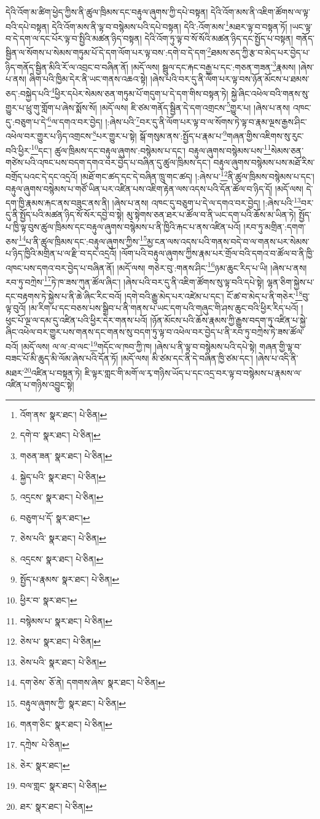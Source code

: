 དེའི་འོག་མ་ཚིག་ཕྱེད་ཀྱིས་ནི་ཚུལ་ཁྲིམས་དང་བརྟུལ་ཞུགས་ཀྱི་དཔེ་བསྟན། དེའི་འོག་མས་ནི་འཇིག་ཚོགས་ལ་ལྟ་བའི་དཔེ་བསྟན། དེའི་འོག་མས་ནི་ལྟ་བ་བསྙེམས་པའི་དཔེ་བསྟན། དེའི་:འོག་མས་\footnote{འོག་ནས་  སྣར་ཐང་།  པེ་ཅིན། }མཐར་ལྟ་བ་བསྟན་ཏོ། །ཡང་ལྟ་བ་དེ་དག་ལ་དང་པོར་ལྟ་བ་སྤྱིའི་མཚན་ཉིད་བསྟན། དེའི་འོག་ཏུ་ལྟ་བ་སོ་སོའི་མཚན་ཉིད་དང་སྤྱོད་པ་བསྟན། གནོད་སྦྱིན་ལ་སོགས་པ་སེམས་གཏུམ་པོ་དེ་དག་ལོག་པར་ལྟ་བས་:དགེ་བ་དེ་དག་\footnote{དགེ་བ་  སྣར་ཐང་།  པེ་ཅིན། }ཐམས་ཅད་ཀྱི་རྩ་བ་མེད་པར་བྱེད་པ་ཉིད་གནོད་སྦྱིན་མིའི་རོ་ལ་འབྲང་བ་བཞིན་ནོ། །མདོ་ལས། སྦྲུལ་དང་རྐང་བརྒྱ་པ་དང་:གཅན་གཟན་\footnote{གཅན་ཟན་  སྣར་ཐང་།  པེ་ཅིན། }རྣམས། །ཞེས་པ་ནས། ཞིག་པའི་ཁྱིམ་དེར་ནི་ཡང་གནས་འཆའ་སྟེ། །ཞེས་པའི་བར་དུ་ནི་ལོག་པར་ལྟ་བས་ཉོན་མོངས་པ་ཐམས་ཅད་:བསྐྱེད་པའི་\footnote{སྐྱེད་པའི་  སྣར་ཐང་།  པེ་ཅིན། }ཕྱིར་དཔེར་སེམས་ཅན་གཏུམ་པོ་གདུག་པ་དེ་དག་གིས་བསྟན་ཏེ། སྐྱེ་ཞིང་འཕེལ་བའི་གནས་སུ་གྱུར་པ་ཕྲུ་གུ་གློག་པ་ཞེས་སྨོས་སོ། །མདོ་ལས། ཇི་ཙམ་གནོད་སྦྱིན་དེ་དག་འགྲངས་\footnote{འདྲངས་  སྣར་ཐང་།  པེ་ཅིན། }གྱུར་པ། །ཞེས་པ་ནས། འཁང་དུ་:བཅུག་པ་དེ་\footnote{བཅུག་པ་དོ་  སྣར་ཐང་། }ལ་དགའ་བར་བྱེད། །:ཞེས་པའི་\footnote{ཅེས་པའི་  སྣར་ཐང་།  པེ་ཅིན། }བར་དུ་ནི་ལོག་པར་ལྟ་བ་ལ་སོགས་ཏེ་ལྟ་བ་རྣམ་ལྔས་རྒྱས་ཤིང་འཕེལ་བར་གྱུར་པ་ཉིད་འགྲངས་\footnote{འདྲངས་  སྣར་ཐང་།  པེ་ཅིན། }པར་གྱུར་པ་སྟེ། སྒོ་གསུམ་ནས་:སྤྱོད་པ་རྣམ་པ་\footnote{སྤྱོད་པ་རྣམས་  སྣར་ཐང་།  པེ་ཅིན། }གཞན་གྱིས་འཇིགས་སུ་རུང་བའི་ཕྱིར་\footnote{ཕྱིར་བ་  སྣར་ཐང་། }དང་། ཚུལ་ཁྲིམས་དང་བརྟུལ་ཞུགས་:བསྙེམས་པ་དང་། བརྟུལ་ཞུགས་བསྙེམས་པས་\footnote{བསྙེམས་པ་  སྣར་ཐང་།  པེ་ཅིན། }སེམས་ཅན་གཙེས་པའི་འཁང་པས་བདག་དགའ་བར་བྱེད་པ་བཞིན་དུ་ཚུལ་ཁྲིམས་དང་། བརྟུལ་ཞུགས་བསྙེམས་པས་མཐོ་རིས་བགྲོད་པའང་དེ་དང་འདྲའོ། །མཐོ་གང་ཚད་དང་དེ་བཞིན་ཁྲུ་གང་ཚད། །:ཞེས་པ་\footnote{ཅེས་པ་  སྣར་ཐང་།  པེ་ཅིན། }ནི་ཚུལ་ཁྲིམས་བསྙེམས་པ་དང་། བརྟུལ་ཞུགས་བསྙེམས་པ་གཙོ་ཡིན་པར་འཛིན་པས་འཇིག་རྟེན་ལས་འདས་པའི་དོན་ཚོལ་བ་ཉིད་དོ། །མདོ་ལས། དེ་དག་ཁྱི་རྣམས་རྐང་ནས་བཟུང་ནས་ནི། །ཞེས་པ་ནས། འཁང་དུ་བཅུག་པ་དེ་ལ་དགའ་བར་བྱེད། །:ཞེས་པའི་\footnote{ཅེས་པའི་  སྣར་ཐང་།  པེ་ཅིན། }བར་དུ་ནི་སྤྱོད་པའི་མཚན་ཉིད་སོ་སོར་དབྱེ་བ་སྟེ། མུ་སྟེགས་ཅན་ཐར་པ་ཚོལ་བ་ནི་ཡང་དག་པའི་ཆོས་མ་ཡིན་ཏེ། སྤྱོད་པ་ཁྱི་ལྟ་བུས་ཚུལ་ཁྲིམས་དང་བརྟུལ་ཞུགས་བསྙེམས་པ་ནི་ཁྱིའི་རྐང་པ་ནས་འཛིན་པའོ། །རབ་ཏུ་མགྲིན་:དགག་ཅས་\footnote{དག་ཅེས་  ཅོ་ནེ། དགགས་ཞེས་  སྣར་ཐང་།  པེ་ཅིན། }པ་ནི་ཚུལ་ཁྲིམས་དང་:བརྟུལ་ཞུགས་ཀྱིས་\footnote{བརྟུལ་ཞུགས་ཀྱི་  སྣར་ཐང་།  པེ་ཅིན། }མྱ་ངན་ལས་འདས་པའི་གནས་བདེ་བ་ལ་གནས་པར་སེམས་པ་ཉིད་ཁྱིའི་མགྲིན་པ་ལ་རྫི་བ་དང་འདྲའོ། །ལོག་པའི་བརྟུལ་ཞུགས་ཀྱིས་རྣམ་པར་གྲོལ་བའི་དགའ་བ་ཚོལ་བ་ནི་ཁྱི་འཁང་པས་དགའ་བར་བྱེད་པ་བཞིན་ནོ། །མདོ་ལས། གཅེར་བུ་:གནས་ཤིང་\footnote{གནག་ཅིང་  སྣར་ཐང་།  པེ་ཅིན། }ཉམ་ཆུང་རིད་པ་ཡི། །ཞེས་པ་ནས། རབ་ཏུ་བཀྲེས་\footnote{དཀྲེས་  པེ་ཅིན། }ཏེ་ཁ་ཟས་ཀུན་ཚོལ་ཞིང་། །ཞེས་པའི་བར་དུ་ནི་འཇིག་ཚོགས་སུ་ལྟ་བའི་དཔེ་སྟེ། ལྷན་ཅིག་སྐྱེས་པ་དང་བརྟགས་ཏེ་སྐྱེས་པ་ནི་ཆེ་ཞིང་རིང་བའོ། །དགེ་བའི་རྒྱུ་མེད་པར་འཛེམ་པ་དང་། ངོ་ཚ་བ་མེད་པ་ནི་གཅེར་\footnote{ཅེར་  སྣར་ཐང་། }བུ་ལྟ་བུའོ། །མ་རིག་པ་དང་བཅས་པས་སྒྲིབ་པ་ནི་གནས་པ་ཡང་དག་པའི་གཞུང་གི་ཤས་ཆུང་བའི་ཕྱིར་རིད་པའོ། །ཕུང་པོ་ལྔ་ལ་དམ་དུ་འཛིན་པའི་ཕྱིར་དེར་གནས་པའོ། །ཉོན་མོངས་པའི་ཆོས་རྣམས་ཀྱི་རྒྱུས་བདག་ཏུ་འཛིན་པ་སྐྱེ་ཞིང་འཕེལ་བར་གྱུར་པས་གནས་དང་གནས་སུ་བདག་ཏུ་ལྟ་བ་འཕེལ་བར་བྱེད་པ་ནི་རབ་ཏུ་བཀྲེས་ཏེ་ཟས་ཚོལ་བའོ། །མདོ་ལས། ལ་ལ་:བ་ལང་\footnote{བལ་གླང་  སྣར་ཐང་།  པེ་ཅིན། }གདོང་ལ་ཁབ་ཀྱི་ཁ། །ཞེས་པ་ནི་ལྟ་བ་བསྙེམས་པའི་དཔེ་སྟེ། གཞན་གྱི་ལྟ་བ་བཟང་པོ་མི་ཆུད་མི་ལོམ་ཞེས་པའི་དོན་ཏོ། །མདོ་ལས། མི་ཙམ་དང་ནི་དེ་བཞིན་ཁྱི་ཙམ་དང་། །ཞེས་པ་འདི་ནི་མཐར་\footnote{ཐར་  སྣར་ཐང་།  པེ་ཅིན། }འཛིན་པ་བསྟན་ཏེ། ཇི་ལྟར་གླང་གི་མགོ་ལ་རྭ་གཉིས་ཡོད་པ་དང་འདྲ་བར་ལྟ་བ་བསྙེམས་པ་རྣམས་ལ་འཛིན་པ་གཉིས་འབྱུང་སྟེ། 